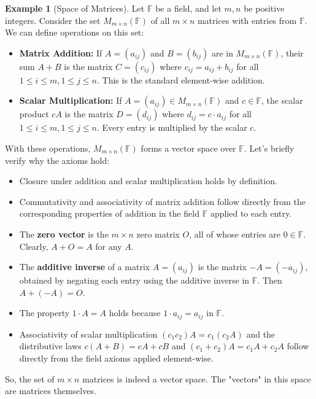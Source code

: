 \documentclass[11pt]{article}
\theoremstyle{definition}
\newtheorem{example}[theorem]{Example}
\newcommand{\F}{\mathbb{F}}
\newcommand{\M}[2]{M_{#1 \times #2}}
\begin{document}
\begin{example}[Space of Matrices]
Let $\F$ be a field, and let $m, n$ be positive integers. Consider the set $\M{m}{n}(\F)$ of all $m \times n$ matrices with entries from $\F$. We can define operations on this set:
\begin{itemize}
    \item \textbf{Matrix Addition:} If $A = (a_{ij})$ and $B = (b_{ij})$ are in $\M{m}{n}(\F)$, their sum $A+B$ is the matrix $C = (c_{ij})$ where $c_{ij} = a_{ij} + b_{ij}$ for all $1 \le i \le m, 1 \le j \le n$. This is the standard element-wise addition.
    \item \textbf{Scalar Multiplication:} If $A = (a_{ij}) \in \M{m}{n}(\F)$ and $c \in \F$, the scalar product $cA$ is the matrix $D = (d_{ij})$ where $d_{ij} = c \cdot a_{ij}$ for all $1 \le i \le m, 1 \le j \le n$. Every entry is multiplied by the scalar $c$.
\end{itemize}
With these operations, $\M{m}{n}(\F)$ forms a vector space over $\F$. Let's briefly verify why the axioms hold:
\begin{itemize}
    \item Closure under addition and scalar multiplication holds by definition.
    \item Commutativity and associativity of matrix addition follow directly from the corresponding properties of addition in the field $\F$ applied to each entry.
    \item The \textbf{zero vector} is the $m \times n$ zero matrix $O$, all of whose entries are $0 \in \F$. Clearly, $A+O = A$ for any $A$.
    \item The \textbf{additive inverse} of a matrix $A = (a_{ij})$ is the matrix $-A = (-a_{ij})$, obtained by negating each entry using the additive inverse in $\F$. Then $A + (-A) = O$.
    \item The property $1 \cdot A = A$ holds because $1 \cdot a_{ij} = a_{ij}$ in $\F$.
    \item Associativity of scalar multiplication $(c_1 c_2)A = c_1(c_2 A)$ and the distributive laws $c(A+B) = cA+cB$ and $(c_1+c_2)A = c_1 A + c_2 A$ follow directly from the field axioms applied element-wise.
\end{itemize}
So, the set of $m \times n$ matrices is indeed a vector space. The "vectors" in this space are matrices themselves.
\end{example}
\end{document}
